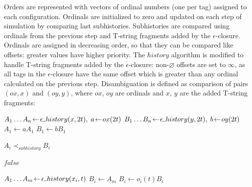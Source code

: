 \documentclass{article}
\newcommand{\Xset}{\!\leftarrow\!}
\newcommand{\Xund}{\rule{.4em}{.4pt}} %
\newcommand{\Xeq}{\!=\!}
\theoremstyle{definition}
\begin{document}
\begin{multicols}{2}
Orders are represented with vectors of ordinal numbers (one per tag) assigned to each configuration.
Ordinals are initialized to zero and updated on each step of simulation by comparing last subhistories.
Subhistories are compared using ordinals from the previous step and T-string fragments added by the $\epsilon$-closure.
Ordinals are assigned in decreasing order, so that they can be compared like offsets:
greater values have higher priority.
The $history$ algorithm is modified to handle T-string fragments added by the $\epsilon$-closure:
non-$\varnothing$ offsets are set to $\infty$, as all tags in the $\epsilon$-closure have the same offset
which is greater than any ordinal calculated on the previous step.
Disambiguation is defined as comparison of pairs $(ox, x)$ and $(oy, y)$,
where $ox$, $oy$ are ordinals and $x$, $y$ are the added T-string fragments:
\\

    \begin{algorithm}[H] \DontPrintSemicolon {} 
     {
        \For {$t \Xeq \overline{1, N}$} {
            $A_1 \dots A_n \Xset \epsilon \Xund history(x, 2t), \; a \Xset ox(2t)$ \;
            $B_1 \dots B_n \Xset \epsilon \Xund history(y, 2t), \; b \Xset oy(2t)$ \;
            $A_1 \Xset a A_1$ \;
            $B_1 \Xset b B_1$ \;


            \For {$i \Xeq \overline{1, n}$} {
                 {\Return $A_i \prec_{subhistory} B_i$}
            }
        }
        \Return $false$ \;
    }
    \end{algorithm}


    \begin{algorithm}[H] \DontPrintSemicolon {}   
     {
        \For {$t \Xeq \overline{1, N}$} {
            \For {$i \Xeq \overline{1, n}$} {
                $A_1 \dots A_m \Xset \epsilon \Xund history(x_i, t)$ \;
                $B_i \Xset A_m$ \;
                \lIf {$m \Xeq 1$} {$B_i \Xset o_i(t) B_i$}
            }

}}
\end{algorithm}
\end{multicols}
\end{document}
